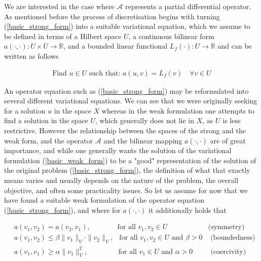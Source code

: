 \documentclass[../draft_1.tex]{subfiles}
\begin{document}
We are interested in the case where $\mathcal{A}$ represents a partial differential operator. As mentioned before the process of discretisation begins with turning (\ref{basic_strong_form}) into a suitable variational equation, which we assume to be defined in terms of a Hilbert space $U$, a continuous bilinear form $a(\cdot, \cdot): U \times U \rightarrow \mathbb{R}$, and a bounded linear functional $L_f(\cdot): U \rightarrow \mathbb{R}$ and can be written as follows
\begin{ceqn}
\begin{equation}
\begin{aligned}
\label{basic_weak_form}
\text{Find } u \in U \text{ such that:  } a(u, v) = L_f(v) \quad \forall v \in U
\end{aligned}
\end{equation}
\end{ceqn}
An operator equation such as (\ref{basic_strong_form}) may be reformulated into several different variational equations. We can see that we were originally seeking for a solution $u$ in the space $X$ whereas in the weak formulation one attempts to find a solution in the space $U$, which generally does not lie in $X$, as $U$ is less restrictive. However the relationship between the spaces of the strong and the weak form, and the operator $\mathcal{A}$ and the bilinear mapping $a(\cdot, \cdot)$ are of great importance, and while one generally wants the solution of the variational formulation (\ref{basic_weak_form}) to be a "good" representation of the solution of the original problem (\ref{basic_strong_form}), the definition of what that exactly means varies and usually depends on the nature of the problem, the overall objective, and often some practicality issues. So let us assume for now that we have found a suitable weak formulation of the operator equation (\ref{basic_strong_form}), and where for $a(\cdot, \cdot)$ it additionally holds that 
\begin{ceqn}
	\begin{equation}
	\begin{aligned}
	&a(v_1, v_2) = a(v_2, v_1), \qquad \ \ \quad \text{ for all } v_1, v_2 \in U \quad &\text{(symmetry)} \\
	&a(v_1, v_2) \leq \beta \|v_1\|_V \cdot \|v_2\|_V , \ \  \text{ for all } v_1, v_2 \in U \text{ and } \beta > 0 &\text{ (boundedness)} \\
    &a(v_1, v_1) \geq \alpha \|v_1\|_V^2, \qquad \quad \quad  \text{ for all } v_1 \in U \text{ and } \alpha > 0 &\text{ (coercivity)}
	\end{aligned}
	\end{equation}	
	\end{ceqn}
\end{document}
